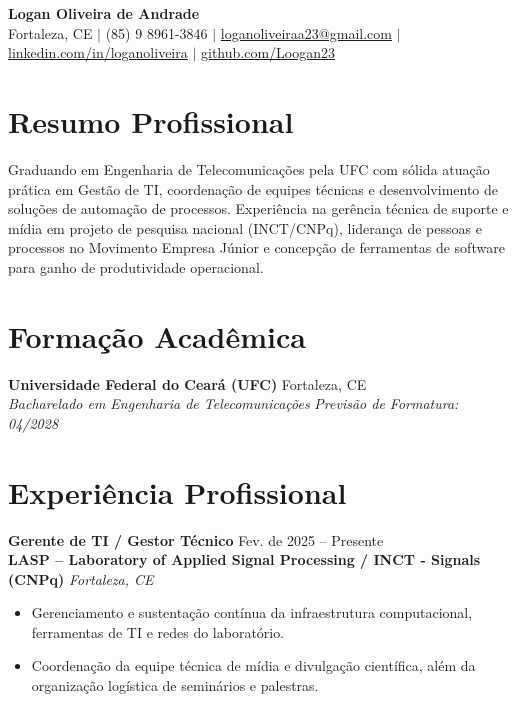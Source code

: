 \documentclass[a4paper,10pt]{article}
\begin{document}
\begin{center}
  {\LARGE \textbf{\color{primary} Logan Oliveira de Andrade}}\\[3pt]
  \small
  Fortaleza, CE $\vert$ (85) 9 8961-3846 $\vert$ 
  \href{mailto:loganoliveiraa23@gmail.com}{loganoliveiraa23@gmail.com} $\vert$ 
  \href{https://www.linkedin.com/in/loganoliveira}{linkedin.com/in/loganoliveira} $\vert$
  \href{https://github.com/Loogan23}{github.com/Loogan23}
\end{center}

\vspace{-6pt}

\section{Resumo Profissional}
Graduando em Engenharia de Telecomunicações pela UFC com sólida atuação prática em Gestão de TI, coordenação de equipes técnicas e desenvolvimento de soluções de automação de processos. Experiência na gerência técnica de suporte e mídia em projeto de pesquisa nacional (INCT/CNPq), liderança de pessoas e processos no Movimento Empresa Júnior e concepção de ferramentas de software para ganho de produtividade operacional.

\section{Formação Acadêmica}
\noindent\textbf{Universidade Federal do Ceará (UFC)} \hfill Fortaleza, CE\\
\textit{Bacharelado em Engenharia de Telecomunicações} \hfill \textit{Previsão de Formatura: 04/2028}

\section{Experiência Profissional}

\noindent\textbf{Gerente de TI / Gestor Técnico} \hfill Fev. de 2025 -- Presente\\
\textbf{LASP -- Laboratory of Applied Signal Processing / INCT - Signals (CNPq)} \hfill \textit{Fortaleza, CE}
\begin{itemize}
  \item Gerenciamento e sustentação contínua da infraestrutura computacional, ferramentas de TI e redes do laboratório.
  \item Coordenação da equipe técnica de mídia e divulgação científica, além da organização logística de seminários e palestras.
\end{itemize}
\end{document}
